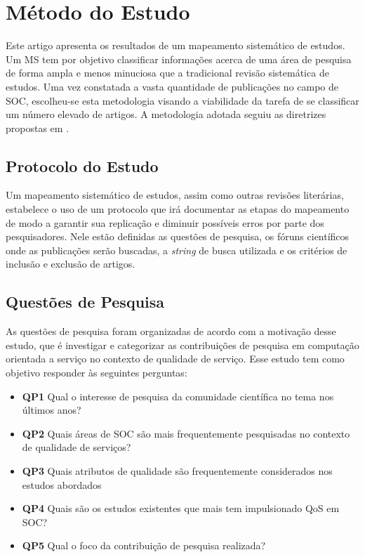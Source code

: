 
\section{Método do Estudo}\label{sec:review_method}

Este artigo apresenta os resultados de um mapeamento sistemático de estudos. Um MS tem por objetivo classificar informações acerca de uma área de pesquisa de forma ampla e menos minuciosa que a tradicional revisão sistemática de estudos. Uma vez constatada a vasta quantidade de publicações no campo de SOC, escolheu-se esta metodologia visando a viabilidade da tarefa de se classificar um número elevado de artigos. A metodologia adotada seguiu as diretrizes propostas em \cite{Petersen:2008:SMS:2227115.2227123}.

\subsection{Protocolo do Estudo}

Um mapeamento sistemático de estudos, assim como outras revisões literárias, estabelece o uso de um protocolo que irá documentar as etapas do mapeamento de modo a garantir sua replicação e diminuir possíveis erros por parte dos pesquisadores. Nele estão definidas as questões de pesquisa, os fóruns científicos onde as publicações serão buscadas, a \textit{string} de busca utilizada e os critérios de inclusão e exclusão de artigos. 

\subsection{Quest\~{o}es de Pesquisa}

As questões de pesquisa foram organizadas de acordo com a motivação desse estudo, que é investigar e categorizar as contribuições de pesquisa em computação orientada a serviço no contexto de qualidade de serviço. Esse estudo tem como objetivo responder às seguintes perguntas: 

\begin{itemize}
\item {\bf QP1} Qual o interesse de pesquisa da comunidade científica no tema nos \'{u}ltimos anos? 
\item {\bf QP2} Quais áreas de SOC são mais frequentemente pesquisadas no contexto de qualidade de serviços?
\item {\bf QP3} Quais atributos de qualidade são frequentemente considerados nos estudos abordados 
\item {\bf QP4} Quais s\~{a}o os estudos existentes que mais tem impulsionado QoS em SOC?
\item {\bf QP5} Qual o foco da contribuição de pesquisa realizada?   
\end{itemize}

